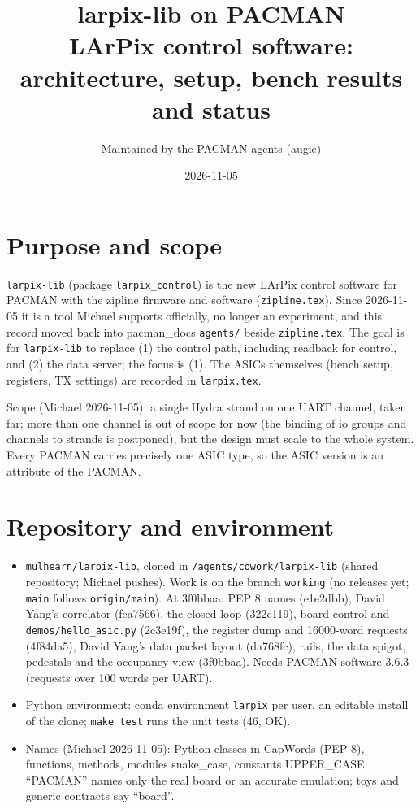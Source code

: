 \documentclass[11pt]{article}
\title{larpix-lib on PACMAN\\[2pt]
  \large LArPix control software:  architecture, setup, bench results and status}
\author{Maintained by the PACMAN agents (augie)}
\date{2026-11-05}
\newcommand{\h}[1]{\texttt{#1}}
\begin{document}
\maketitle
\sloppy

\section{Purpose and scope}

\h{larpix-lib} (package \h{larpix\_control}) is the new LArPix control software for PACMAN with the zipline firmware
and software (\h{zipline.tex}).  Since 2026-11-05 it is a tool Michael supports officially, no longer an experiment,
and this record moved back into pacman\_docs \h{agents/} beside \h{zipline.tex}.  The goal is for \h{larpix-lib} to
replace (1) the control path, including readback for control, and (2) the data server;  the focus is (1).  The ASICs
themselves (bench setup, registers, TX settings) are recorded in \h{larpix.tex}.

Scope (Michael 2026-11-05):  a single Hydra strand on one UART channel, taken far;  more than one channel is out of
scope for now (the binding of io groups and channels to strands is postponed), but the design must scale to the whole
system.  Every PACMAN carries precisely one ASIC type, so the ASIC version is an attribute of the PACMAN.

\section{Repository and environment}

\begin{itemize}
\item \h{mulhearn/larpix-lib}, cloned in \h{/agents/cowork/larpix-lib} (shared repository;  Michael pushes).  Work is
  on the branch \h{working} (no releases yet;  \h{main} follows \h{origin/main}).  At 3f0bbaa:  PEP 8 names
  (e1e2dbb), David Yang's correlator (fea7566), the closed loop (322c119), board control and
  \h{demos/hello\_asic.py} (2c3e19f), the register dump and 16000-word requests (4f84da5), David Yang's data
  packet layout (da768fc), rails, the data spigot, pedestals and the occupancy view (3f0bbaa).  Needs PACMAN
  software 3.6.3 (requests over 100 words per UART).
\item Python environment:  conda environment \h{larpix} per user, an editable install of the clone;  \h{make test}
  runs the unit tests (46, OK).
\item Names (Michael 2026-11-05):  Python classes in CapWords (PEP 8), functions, methods, modules snake\_case,
  constants UPPER\_CASE.  ``PACMAN'' names only the real board or an accurate emulation;  toys and generic contracts
  say ``board''.
\end{itemize}
\end{document}
